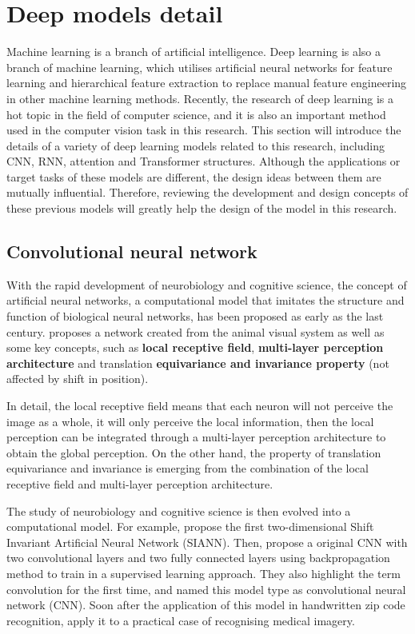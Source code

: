 \section{Deep models detail}
\label{sec:Deep models detail}
Machine learning is a branch of artificial intelligence. Deep learning is also a branch of machine learning, which utilises artificial neural networks for feature learning and hierarchical feature extraction to replace manual feature engineering in other machine learning methods.
Recently, the research of deep learning is a hot topic in the field of computer science, and it is also an important method used in the computer vision task in this research.
This section will introduce the details of a variety of deep learning models related to this research, including CNN, RNN, attention and Transformer structures.
Although the applications or target tasks of these models are different, the design ideas between them are mutually influential.
Therefore, reviewing the development and design concepts of these previous models will greatly help the design of the model in this research.

\subsection{Convolutional neural network} %
With the rapid development of neurobiology and cognitive science, the concept of artificial neural networks, a computational model that imitates the structure and function of biological neural networks, has been proposed as early as the last century.
\citet{fukushima1980neocognitron} proposes a network created from the animal visual system as well as some key concepts, such as \textbf{local receptive field}, \textbf{multi-layer perception architecture} and translation \textbf{equivariance and invariance property} (not affected by shift in position).

In detail, the local receptive field means that each neuron will not perceive the image as a whole, it will only perceive the local information, then the local perception can be integrated through a multi-layer perception architecture to obtain the global perception.
On the other hand, the property of translation equivariance and invariance is emerging from the combination of the local receptive field and multi-layer perception architecture.

The study of neurobiology and cognitive science is then evolved into a computational model. For example, \citet{zhang1988shift} propose the first two-dimensional Shift Invariant Artificial Neural Network (SIANN).
Then, \citet{lecun1989backpropagation} propose a original CNN with two convolutional layers and two fully connected layers using backpropagation method to train in a supervised learning approach.
They also highlight the term convolution for the first time, and named this model type as convolutional neural network (CNN).
Soon after the application of this model in handwritten zip code recognition, \citet{zhang1994computerized} apply it to a practical case of recognising medical imagery.

